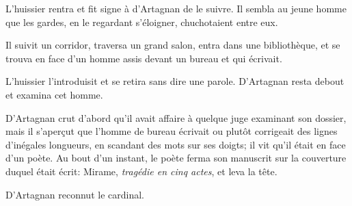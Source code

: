 L'huissier rentra et fit signe à d'Artagnan de le suivre. Il sembla au jeune homme que les gardes, en le regardant s'éloigner, chuchotaient entre eux. 

Il suivit un corridor, traversa un grand salon, entra dans une bibliothèque, et se trouva en face d'un homme assis devant un bureau et qui écrivait. 

L'huissier l'introduisit et se retira sans dire une parole. D'Artagnan resta debout et examina cet homme. 

D'Artagnan crut d'abord qu'il avait affaire à quelque juge examinant son dossier, mais il s'aperçut que l'homme de bureau écrivait ou plutôt corrigeait des lignes d'inégales longueurs, en scandant des mots sur ses doigts; il vit qu'il était en face d'un poète. Au bout d'un instant, le poète ferma son manuscrit sur la couverture duquel était écrit: Mirame, \textit{tragédie en cinq actes}, et leva la tête. 

D'Artagnan reconnut le cardinal.